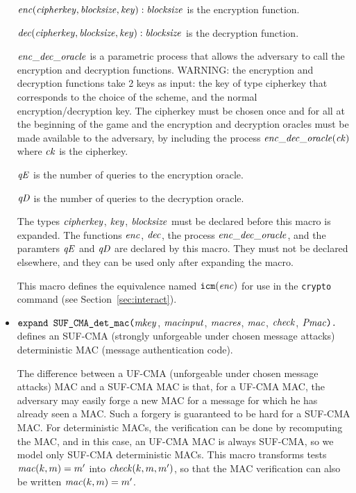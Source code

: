 \documentclass{article}
\begin{document}
\begin{itemize}
   $\mathit{enc}(\mathit{cipherkey}, \mathit{blocksize}, \mathit{key}): \mathit{blocksize}$ is the encryption function.

   $\mathit{dec}(\mathit{cipherkey}, \mathit{blocksize}, \mathit{key}): \mathit{blocksize}$ is the decryption function.

   $\mathit{enc\_dec\_oracle}$ is a parametric process that allows the adversary to
   call the encryption and decryption functions.
   WARNING: the encryption and decryption functions take 2 keys as
   input: the key of type cipherkey that corresponds to the choice of
   the scheme, and the normal encryption/decryption key. The cipherkey
   must be chosen once and for all at the beginning of the game and
   the encryption and decryption oracles must be made available to the
   adversary, by including the process $\mathit{enc\_dec\_oracle}(\mathit{ck})$
   where $\mathit{ck}$ is the cipherkey.

   $\mathit{qE}$ is the number of queries to the encryption oracle.

   $\mathit{qD}$ is the number of queries to the decryption oracle.
 
   The types $\mathit{cipherkey}$, $\mathit{key}$, $\mathit{blocksize}$ must be
   declared before this macro is expanded. The functions $\mathit{enc}$,
   $\mathit{dec}$, the process $\mathit{enc\_dec\_oracle}$, and the paramters 
   $\mathit{qE}$ and $\mathit{qD}$ are declared by this macro. They must not be declared
   elsewhere, and they can be used only after expanding the macro.

   This macro defines the equivalence named $\texttt{icm}(\mathit{enc})$
   for use in the \texttt{crypto} command 
   (see Section~\ref{sec:interact}).

\item $\texttt{expand SUF\_CMA\_det\_mac(}\mathit{mkey}$,
$  \mathit{macinput}$, $\mathit{macres}$, $\mathit{mac}$, $\mathit{check}$,
$  \mathit{Pmac}\texttt{).}$ defines an SUF-CMA (strongly unforgeable under chosen
  message attacks) deterministic MAC (message authentication code).

  The difference between a UF-CMA (unforgeable under chosen message
  attacks) MAC and a SUF-CMA MAC is that, for a UF-CMA MAC, the
  adversary may easily forge a new MAC for a message for which he has
  already seen a MAC. Such a forgery is guaranteed to be hard for a
  SUF-CMA MAC. For deterministic MACs, the verification can be done by
  recomputing the MAC, and in this case, an UF-CMA MAC is always
  SUF-CMA, so we model only SUF-CMA deterministic MACs. This macro
  transforms tests $\mathit{mac}(k,m) = m'$ into $\mathit{check}(k, m, m')$,
  so that the MAC verification can also be written
  $\mathit{mac}(k,m) = m'$.


\end{itemize}
\end{document}
